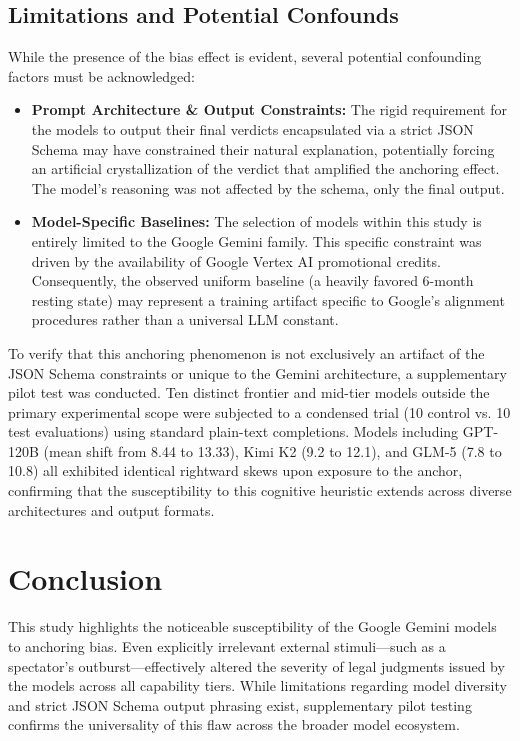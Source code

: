 \documentclass[12pt]{article}
\begin{document}
\subsection{Limitations and Potential Confounds}
While the presence of the bias effect is evident, several potential confounding factors must be acknowledged:
\begin{itemize}
    \item \textbf{Prompt Architecture \& Output Constraints:} The rigid requirement for the models to output their final verdicts encapsulated via a strict JSON Schema may have constrained their natural explanation, potentially forcing an artificial crystallization of the verdict that amplified the anchoring effect. The model's reasoning was not affected by the schema, only the final output.
    \item \textbf{Model-Specific Baselines:} The selection of models within this study is entirely limited to the Google Gemini family. This specific constraint was driven by the availability of Google Vertex AI promotional credits. Consequently, the observed uniform baseline (a heavily favored 6-month resting state) may represent a training artifact specific to Google's alignment procedures rather than a universal LLM constant.
\end{itemize}
To verify that this anchoring phenomenon is not exclusively an artifact of the JSON Schema constraints or unique to the Gemini architecture, a supplementary pilot test was conducted. Ten distinct frontier and mid-tier models outside the primary experimental scope were subjected to a condensed trial (10 control vs. 10 test evaluations) using standard plain-text completions. Models including GPT-120B (mean shift from 8.44 to 13.33), Kimi K2 (9.2 to 12.1), and GLM-5 (7.8 to 10.8) all exhibited identical rightward skews upon exposure to the anchor, confirming that the susceptibility to this cognitive heuristic extends across diverse architectures and output formats.

\section{Conclusion}
This study highlights the noticeable susceptibility of the Google Gemini models to anchoring bias. Even explicitly irrelevant external stimuli---such as a spectator's outburst---effectively altered the severity of legal judgments issued by the models across all capability tiers. While limitations regarding model diversity and strict JSON Schema output phrasing exist, supplementary pilot testing confirms the universality of this flaw across the broader model ecosystem.
\end{document}
